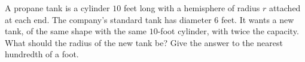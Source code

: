 A propane tank is a cylinder $10$ feet long with a hemisphere of radius $r$ attached at each end. The company's standard tank has diameter $6$ feet. It wants a new tank, of the same shape with the same $10$-foot cylinder, with twice the capacity. What should the radius of the new tank be? Give the answer to the nearest hundredth of a foot.
